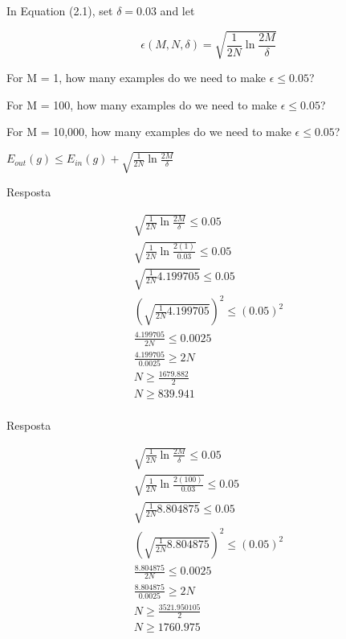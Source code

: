 \begin{enunciado}{1}
    In Equation (2.1), set $\delta = 0.03$ and let
    
    $$ \epsilon(M, N, \delta) = \sqrt{\frac{1}{2N} \ln{\frac{2M}{\delta}}}$$
    
     For M = 1, how many examples do we need to make $\epsilon \le 0.05$?
    
     For M = 100, how many examples do we need to make $\epsilon \le 0.05$?
    
     For M = 10,000, how many examples do we need to make $\epsilon \le 0.05$?
    
    \begin{grayt}
		$ E_{out}(g) \leq E_{in}(g) + \sqrt{\frac{1}{2N} \ln{\frac{2M}{\delta}}} $
    \end{grayt}
    
\end{enunciado}

 Resposta

\begin{align*}
	\sqrt{\frac{1}{2N} \ln{\frac{2M}{\delta}}} \le 0.05 \\
	\sqrt{\frac{1}{2N} \ln{\frac{2(1)}{0.03}}} \le 0.05 \\
	\sqrt{\frac{1}{2N} {4.199705}} \le 0.05 \\
	\left( \sqrt{\frac{1}{2N} {4.199705}} \right) ^ {2} \le (0.05)^{2} \\
	\frac{4.199705}{2N} \le 0.0025 \\
	\frac{4.199705}{0.0025} \ge 2N \\
	N \ge \frac{1679.882}{2} \\
	N \ge {839.941} \\
\end{align*}


 Resposta

\begin{align*}
	\sqrt{\frac{1}{2N} \ln{\frac{2M}{\delta}}} \le 0.05 \\
	\sqrt{\frac{1}{2N} \ln{\frac{2(100)}{0.03}}} \le 0.05 \\
	\sqrt{\frac{1}{2N} {8.804875}} \le 0.05 \\
	\left( \sqrt{\frac{1}{2N} {8.804875}} \right) ^ {2} \le (0.05)^{2} \\
	\frac{8.804875}{2N} \le 0.0025 \\
	\frac{8.804875}{0.0025} \ge 2N \\
	N \ge \frac{3521.950105}{2} \\
	N \ge {1760.975} \\
\end{align*}


